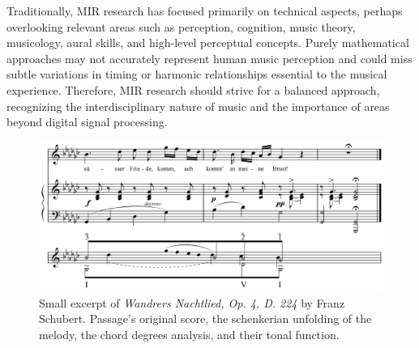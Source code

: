 Traditionally, MIR research has focused primarily on technical aspects, perhaps overlooking relevant areas such as perception, cognition, music theory, musicology, aural skills, and high-level perceptual concepts. Purely mathematical approaches may not accurately represent human music perception and could miss subtle variations in timing or harmonic relationships essential to the musical experience. Therefore, MIR research should strive for a balanced approach, recognizing the interdisciplinary nature of music and the importance of areas beyond digital signal processing.


\begin{figure}[ht]
\includegraphics[clip,width=\columnwidth]{figures/schenkerian analysis/SchubertOp4no3.png}%
\caption[Excerpt of \textit{Wandrers Nachtlied, Op. 4, D. 224} by Franz Schubert.]{\small{Small excerpt of \textit{Wandrers Nachtlied, Op. 4, D. 224} by Franz Schubert. Passage's original score, the schenkerian unfolding of the melody, the chord degrees analysis, and their tonal function.}}
\label{fig:Wandrers Nachtlied, Op. 4, D. 224}
\end{figure}